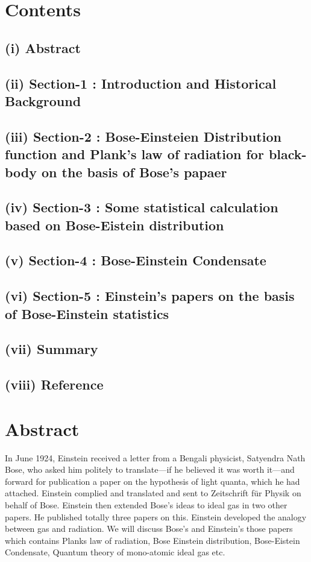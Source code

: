 \documentclass[12pt, letterpaper]{article}
\begin{document}
    \section*{Contents}
    \subsection*{(i) Abstract}
    \subsection*{(ii) Section-1 : Introduction and Historical Background}
    \subsection*{(iii) Section-2 : Bose-Einsteien Distribution function and Plank's law of radiation for black-body on the basis of Bose's papaer}
    \subsection*{(iv) Section-3 : Some statistical calculation based on Bose-Eistein distribution}
    \subsection*{(v) Section-4 : Bose-Einstein Condensate}
    \subsection*{(vi) Section-5 : Einstein's papers on the basis of Bose-Einstein statistics}
    \subsection*{(vii) Summary}
    \subsection*{(viii) Reference}
    \newpage
    \section*{Abstract}
        In June 1924, Einstein received a letter from a Bengali physicist,
        Satyendra Nath Bose, who asked him politely to translate—if he believed it
        was worth it—and forward for publication a paper on the hypothesis of light
        quanta, which he had attached. Einstein complied and translated and sent
        to Zeitschrift für Physik on behalf of Bose. Einstein then extended Bose's ideas to ideal gas in two other papers.
        He published totally three papers on this. Einstein developed the analogy between gas and radiation.
        We will discuss Bose's and Einstein's those papers which contains Planks law of radiation, Bose Einstein
        distribution, Bose-Eistein Condensate, Quantum theory of mono-atomic ideal gas etc. 
        \newpage
\end{document}

